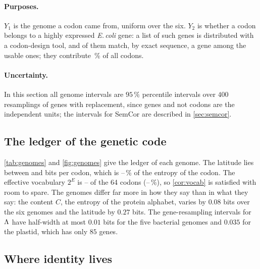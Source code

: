 \paragraph{Purposes.} $Y_1$ is the genome a codon came from, uniform over the six. $Y_2$ is whether a codon belongs to a highly expressed \emph{E.\,coli} gene: a list of \HegFile{} such genes is distributed with a codon-design tool, and \HegMatched{} of them match, by exact sequence, a gene among the \HegGenes{} usable ones; they contribute \HegPone\,\% of all codons.
\paragraph{Uncertainty.} In this section all genome intervals are $95\,\%$ percentile intervals over $400$ resamplings of genes with replacement, since genes and not codons are the independent units; the intervals for SemCor are described in \cref{sec:semcor}.

\subsection{The ledger of the genetic code}
\cref{tab:genomes} and \cref{fig:genomes} give the ledger of each genome. The latitude lies between \SminGenome{} and \SmaxGenome{} bits per codon, which is \rhoMin--\rhoMax{}\,\% of the entropy of the codon. The effective vocabulary $2^E$ is \EffMin--\EffMax{} of the 64 codons (\EffShareMin--\EffShareMax{}\,\%), so \cref{cor:vocab} is satisfied with room to spare. The genomes differ far more in how they say than in what they say: the content $C$, the entropy of the protein alphabet, varies by $0.08$ bits over the six genomes and the latitude by $0.27$ bits. The gene-resampling intervals for $\Lambda$ have half-width at most $0.01$ bits for the five bacterial genomes and $0.035$ for the plastid, which has only $85$ genes.
\begin{table}[tbp]
\caption{The ledger of the genetic code, $\Dbt=0$. Bits per codon; GC3 is the fraction of G or C at the third position of sense codons; $2^E$ is the effective number of codons.}\label{tab:genomes}
\centering\small

\end{table}


\subsection{Where identity lives}\label{sec:identity}
